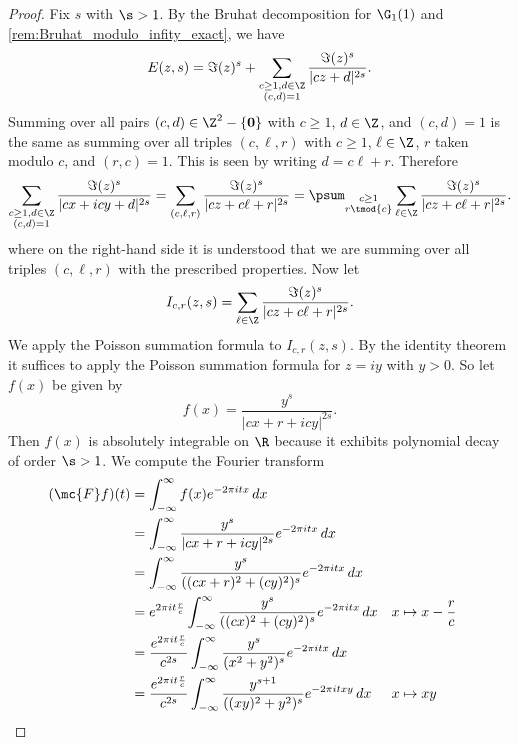      \begin{proof}
        Fix $s$ with $\s > 1$. By the Bruhat decomposition for $\G_{1}(1)$ and \cref{rem:Bruhat_modulo_infity_exact}, we have
        \[
          E(z,s) = \Im(z)^{s}+\sum_{\substack{c \ge 1, d \in \Z \\ (c,d) = 1}}\frac{\Im(z)^{s}}{|cz+d|^{2s}}.
        \]
        Summing over all pairs $(c,d) \in \Z^{2}-\{\mathbf{0}\}$ with $c \ge 1$, $d \in \Z$, and $(c,d) = 1$ is the same as summing over all triples $(c,\ell,r)$ with $c \ge 1$, $\ell \in \Z$, $r$ taken modulo $c$, and $(r,c) = 1$. This is seen by writing $d = c\ell+r$. Therefore
        \[
          \sum_{\substack{c \ge 1, d \in \Z \\ (c,d) = 1}}\frac{\Im(z)^{s}}{|cx+icy+d|^{2s}} = \sum_{(c,\ell,r)}\frac{\Im(z)^{s}}{|cz+c\ell+r|^{2s}} = \psum_{\substack{c \ge 1 \\ r \tmod{c}}}\sum_{\ell \in \Z}\frac{\Im(z)^{s}}{|cz+c\ell+r|^{2s}}.
        \]
         where on the right-hand side it is understood that we are summing over all triples $(c,\ell,r)$ with the prescribed properties. Now let
        \[
          I_{c,r}(z,s) = \sum_{\ell \in \Z}\frac{\Im(z)^{s}}{|cz+c\ell+r|^{2s}}.
        \]
        We apply the Poisson summation formula to $I_{c,r}(z,s)$. By the identity theorem it suffices to apply the Poisson summation formula for $z = iy$ with $y > 0$. So let $f(x)$ be given by
        \[
          f(x) = \frac{y^{s}}{|cx+r+icy|^{2s}}.
        \]
        Then $f(x)$ is absolutely integrable on $\R$ because it exhibits polynomial decay of order $\s > 1$. We compute the Fourier transform
        \begin{align*}
          (\mc{F}f)(t) &= \int_{-\infty}^{\infty}f(x)e^{-2\pi itx}\,dx \\
          &= \int_{-\infty}^{\infty}\frac{y^{s}}{|cx+r+icy|^{2s}}e^{-2\pi itx}\,dx \\
          &= \int_{-\infty}^{\infty}\frac{y^{s}}{((cx+r)^{2}+(cy)^{2})^{s}}e^{-2\pi itx}\,dx \\
          &= e^{2\pi it\frac{r}{c}}\int_{-\infty}^{\infty}\frac{y^{s}}{((cx)^{2}+(cy)^{2})^{s}}e^{-2\pi itx}\,dx && \text{$x \mapsto x-\frac{r}{c}$} \\
          &= \frac{e^{2\pi it\frac{r}{c}}}{c^{2s}}\int_{-\infty}^{\infty}\frac{y^{s}}{(x^{2}+y^{2})^{s}}e^{-2\pi itx}\,dx \\
          &= \frac{e^{2\pi it\frac{r}{c}}}{c^{2s}}\int_{-\infty}^{\infty}\frac{y^{s+1}}{((xy)^{2}+y^{2})^{s}}e^{-2\pi itxy}\,dx && \text{$x \mapsto xy$} \\

\end{align*}
\end{proof}
